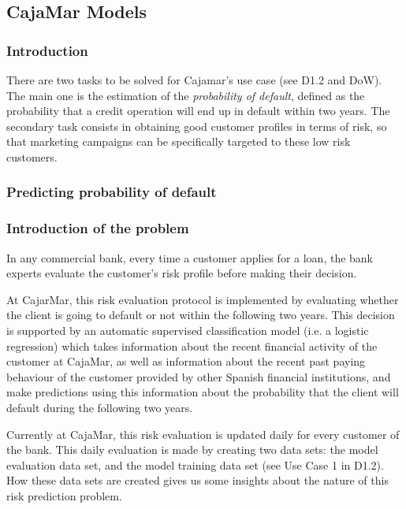 \subsection{CajaMar Models}
\label{Section:CajaMarModels}

\subsubsection{Introduction}

There are two tasks to be solved for Cajamar's use case (see D1.2 and DoW). The main one is
the estimation of the \emph{probability of default}, defined as the probability that a
credit operation will end up in default within two years. The secondary task consists in obtaining 
good customer profiles in terms of risk, so that marketing campaigns can be
specifically targeted to these low risk customers. 

\subsubsection{Predicting probability of default}

\subsubsection*{Introduction of the problem} 

In any commercial bank, every time a customer applies for a loan, the bank experts evaluate the customer's risk profile before making their decision. 

At CajarMar, this risk evaluation protocol is implemented by evaluating whether the client is going to default or not within the following two years. This decision is supported by an automatic supervised classification model (i.e. a logistic regression) which takes information about the recent financial activity of the customer at CajaMar, as well as information about the recent past paying behaviour of the customer provided by other Spanish financial institutions, and make predictions using this information about the probability that the client will default during the following two years.

Currently at CajaMar, this risk evaluation is updated daily for every customer of the bank. This daily evaluation is made by creating two data sets: the model evaluation data set, and the model training data set (see Use Case 1 in D1.2). How these data sets are created gives us some insights about the nature of this risk prediction problem. 

